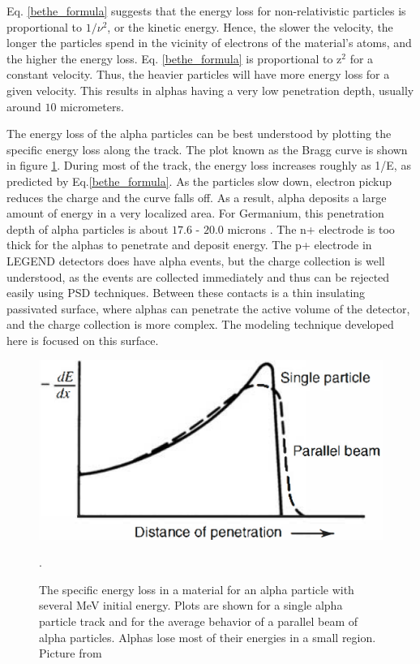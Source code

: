 Eq. \ref{bethe_formula} suggests that the energy loss for non-relativistic particles is proportional to $1/\nu^2$, or the kinetic energy. Hence, the slower the velocity, the longer the particles spend in the vicinity of electrons of the material's atoms, and the higher the energy loss. Eq. \ref{bethe_formula} is proportional to z$^2$ for a constant velocity. Thus, the heavier particles will have more energy loss for a given velocity. This results in alphas having a very low penetration depth, usually around $10$ micrometers.

The energy loss of the alpha particles can be best understood by plotting the specific energy loss along the track. The plot known as the Bragg curve is shown in figure \ref{bragg_curve_fig}. During most of the track, the energy loss increases roughly as 1/E, as predicted by Eq.\ref{bethe_formula}. As the particles slow down, electron pickup reduces the charge and the curve falls off. As a result, alpha deposits a large amount of energy in a very localized area. For Germanium, this penetration depth of alpha particles is about $17.6$ - $20.0$ microns \cite{knoll_2010}. The n+ electrode is too thick for the alphas to penetrate and deposit energy. The p+ electrode in LEGEND detectors does have alpha events, but the charge collection is well understood, as the events are collected immediately and thus can be rejected easily using PSD techniques. Between these contacts is a thin insulating passivated surface, where alphas can penetrate the active volume of the detector, and the charge collection is more complex. The modeling technique developed here is focused on this surface.

\begin{figure}
\centering
\includegraphics[width=0.5\linewidth]{ch3/figs/bragg_curve.png}
\caption{The specific energy loss in a material for an alpha particle with several MeV initial energy. Plots are shown for a single alpha particle track and for the average behavior of a parallel beam of alpha particles. Alphas lose most of their energies in a small region. Picture from \cite{knoll_2010}}. 
\label{bragg_curve_fig}
\end{figure}

